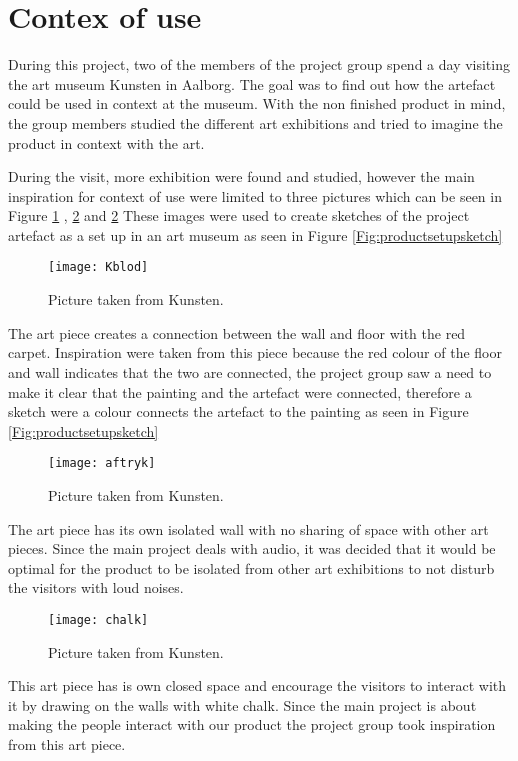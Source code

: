  
 
 \section{Contex of use}
During this project, two of the members of the project group spend a day visiting the art museum Kunsten in Aalborg. The goal was to find out how the artefact could be used in context at the museum. With the non finished product in mind, the group members studied the different art exhibitions and tried to imagine the product in context with the art. 

During the visit, more exhibition were found and studied, however the main inspiration for context of use were limited to three pictures which can be seen in Figure \ref{Fig:Kblod} , \ref{Fig:aftryk} and \ref{Fig:aftryk} These images were used to create sketches of the project artefact as a set up in an art museum as seen in Figure \ref{Fig:productsetupsketch}

\begin{figure}[!h] 
\centering
\texttt{[image: Kblod]}
\caption{\label{Fig:Kblod} Picture taken from Kunsten.}
\end{figure}
The art piece creates a connection between the wall and floor with the red carpet. Inspiration were taken from this piece because the red colour of the floor and wall indicates that the two are connected, the project group saw a need to make it clear that the painting and the artefact were connected, therefore a sketch were a colour connects the artefact to the painting as seen in Figure \ref{Fig:productsetupsketch}


\begin{figure}[!h] 
\centering
\texttt{[image: aftryk]}
\caption{\label{Fig:aftryk} Picture taken from Kunsten.}
\end{figure}
The art piece has its own isolated wall with no sharing of space with other art pieces. Since the main project deals with audio, it was decided that it would be optimal for the product to be isolated from other art exhibitions to not disturb the visitors with loud noises.
 
 \begin{figure}[!h] 
\centering
\texttt{[image: chalk]}
\caption{\label{Fig:chalk} Picture taken from Kunsten.}
\end{figure}
This art piece has is own closed space and encourage the visitors to interact with it by drawing on the walls with white chalk. Since the main project is about making the people interact with our product  the project group took inspiration from this art piece. 

